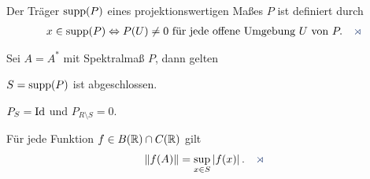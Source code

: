 \begin{defn*}
Der Träger $\operatorname{supp}(P)$ eines projektionswertigen Maßes $P$ ist definiert durch
\begin{align*}
x\in \supp(P) \Leftrightarrow P(U)\neq 0 \text{ für jede offene Umgebung
}U\text{ von }P.\fishhere
\end{align*} 
\end{defn*}

\begin{lem}
\label{prop:6.5}
Sei $A=A^*$ mit Spektralmaß $P$, dann gelten
\begin{propenum}
\item $S=\operatorname{supp}(P)$ ist abgeschlossen.
\item\label{lem:6.4*:2} $P_S=\mathrm{Id}$ und $P_{R\setminus S} = 0$.
\item Für jede Funktion $f\in B(\mathbb{R})\cap C(\mathbb{R})$ gilt
\begin{align*}
\norm{f(A)} = \sup_{x\in S}\abs{f(x)}.\fishhere
\end{align*}
\end{propenum}
\end{lem}

